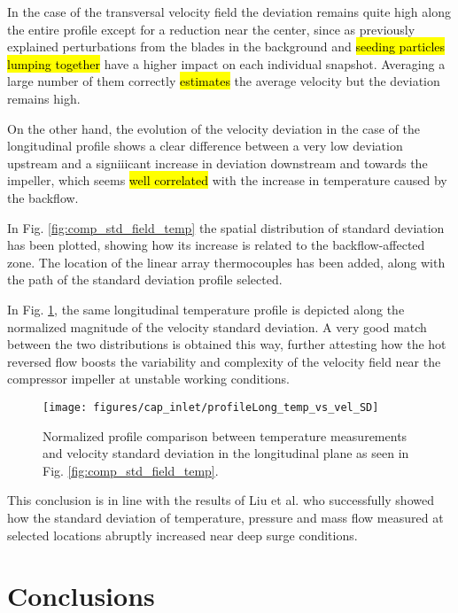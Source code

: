 In the case of the transversal velocity field the deviation remains quite high along the entire profile except for a reduction near the center, since as previously explained perturbations from the blades in the background and \hl{seeding particles lumping together} have a higher impact on each individual snapshot. Averaging a large number of them correctly \hl{estimates} the average velocity but the deviation remains high.

On the other hand, the evolution of the velocity deviation in the case of the longitudinal profile shows a clear difference between a very low deviation upstream and a signiiicant increase in deviation downstream and towards the impeller, which seems \hl{well correlated} with the increase in temperature caused by the backflow.

In Fig. \ref{fig:comp_std_field_temp} the spatial distribution of standard deviation has been plotted, showing how its increase is related to the backflow-affected zone. The location of the linear array thermocouples has been added, along with the path of the standard deviation profile selected.

In Fig. \ref{fig:profiles_temp_vs_vel_long_SD}, the same longitudinal temperature profile is depicted along the normalized magnitude of the velocity standard deviation. A very good match between the two distributions is obtained this way, further attesting how the hot reversed flow boosts the variability and complexity of the velocity field near the compressor impeller at unstable working conditions. 

\begin{figure}[thb!]
\centering
\texttt{[image: figures/cap\_inlet/profileLong\_temp\_vs\_vel\_SD]}
\caption{Normalized profile comparison between temperature measurements and velocity standard deviation in the longitudinal plane as seen in Fig. \ref{fig:comp_std_field_temp}.}
\label{fig:profiles_temp_vs_vel_long_SD}
\end{figure}

This conclusion is in line with the results of Liu et al. \cite{liu2013methods} who successfully showed how the standard deviation of temperature, pressure and mass flow measured at selected locations abruptly increased near deep surge conditions. 

\section{Conclusions}
